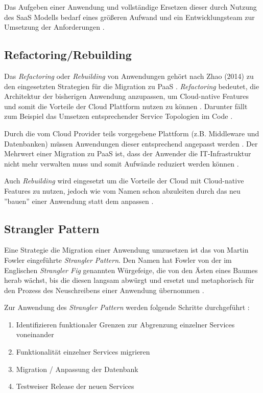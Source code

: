 Das Aufgeben einer Anwendung und vollständige Ersetzen dieser durch Nutzung des \ac{SaaS} Modells bedarf eines größeren Aufwand und ein Entwicklungsteam zur Umsetzung der Anforderungen \cite[Vgl.][]{CIO}. \pagebreak

\subsection{Refactoring/Rebuilding}
Das \textit{Refactoring} oder \textit{Rebuilding} von Anwendungen gehört nach Zhao (2014) zu den eingesetzten Strategien für die Migration zu \ac{PaaS} \cite[Vgl.][S. 144]{Zhao2014}. \textit{Refactoring} bedeutet, die Architektur der bisherigen Anwendung anzupassen, um Cloud-native Features \cite[Vgl.][S. 2]{Ahmad2018} und somit die Vorteile der Cloud Plattform nutzen zu können \cite[Vgl.][]{CIO}. Darunter fällt zum Beispiel das Umsetzen entsprechender Service Topologien im Code \cite[Vgl.][S. 2]{Holmes2018}.

Durch die vom Cloud Provider teils vorgegebene Plattform (z.B. Middleware und Datenbanken) müssen Anwendungen dieser entsprechend angepasst werden \cite[Vgl.][S. 227]{Surianarayanan2019}. Der Mehrwert einer Migration zu \ac{PaaS} ist, dass der Anwender die IT-Infrastruktur nicht mehr verwalten muss und somit Aufwände reduziert werden können \cite[Vgl.][S. 6]{Pahl}.

Auch \textit{Rebuilding} wird eingesetzt um die Vorteile der Cloud mit Cloud-native Features zu nutzen, jedoch wie vom Namen schon abzuleiten durch das neu ''bauen'' einer Anwendung statt dem anpassen \cite[Vgl.][S. 2]{Ahmad2018}.

\subsection{Strangler Pattern}
Eine Strategie die Migration einer Anwendung umzusetzen ist das von Martin Fowler eingeführte \textit{Strangler Pattern}. Den Namen hat Fowler von der im Englischen \textit{Strangler Fig} genannten Würgefeige, die von den Ästen eines Baumes herab wächst, bis die diesen langsam abwürgt und ersetzt und metaphorisch für den Prozess des Neuschreibens einer Anwendung übernommen \cite[Vgl.][]{Fowler2004}\cite[Vgl.][]{Ibryam2021}.

Zur Anwendung des \textit{Strangler Pattern} werden folgende Schritte durchgeführt \cite[Vgl. auch im Folgenden][]{Ibryam2021}:

\begin{enumerate}
    \item Identifizieren funktionaler Grenzen zur Abgrenzung einzelner Services voneinander
    \item Funktionalität einzelner Services migrieren
    \item Migration / Anpassung der Datenbank
    \item Testweiser Release der neuen Services
\end{enumerate}

